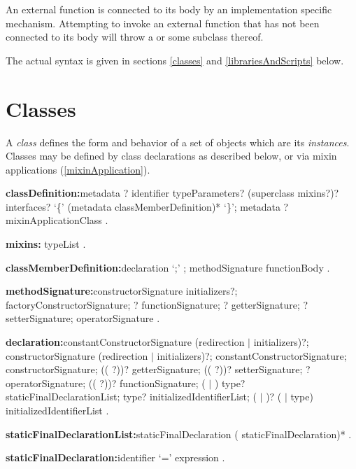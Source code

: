 \documentclass{article}
\begin{document}
\LMHash{}
An external function is connected to its body by an implementation specific mechanism.
Attempting to invoke an external function that has not been connected to its body will throw a  or some subclass thereof.

\LMHash{}
The actual syntax is given in sections \ref{classes} and \ref{librariesAndScripts} below.


\section{Classes}

\LMHash{}
A {\em class} defines the form and behavior of a set of objects which are its {\em instances}.
Classes may be defined by class declarations as described below, or via mixin applications (\ref{mixinApplication}).

\begin{grammar}
{\bf classDefinition:}metadata \ABSTRACT{}? \CLASS{} identifier typeParameters?
  \gnewline{} (superclass mixins?)? interfaces?
  \gnewline{} `\{' (metadata classMemberDefinition)* `\}';
  metadata \ABSTRACT{}? \CLASS{} mixinApplicationClass
  .

{\bf mixins:}\WITH{} typeList
  .

{\bf classMemberDefinition:}declaration `{\escapegrammar ;}' ;
  methodSignature functionBody
  .

{\bf methodSignature:}constructorSignature initializers?;
  factoryConstructorSignature;
  \STATIC{}? functionSignature;
  \STATIC{}? getterSignature;
  \STATIC{}? setterSignature;
  operatorSignature
  .

{\bf declaration:}constantConstructorSignature (redirection $|$ initializers)?;
  constructorSignature (redirection $|$ initializers)?;
  \EXTERNAL{} constantConstructorSignature;
  \EXTERNAL{} constructorSignature;
  ((\EXTERNAL{} \STATIC{}?))? getterSignature;
  ((\EXTERNAL{} \STATIC{}?))? setterSignature;
  \EXTERNAL{}? operatorSignature;
  ((\EXTERNAL{} \STATIC{}?))? functionSignature;
  \STATIC{} (\FINAL{} $|$ \CONST{}) type? staticFinalDeclarationList;
  \FINAL{} type? initializedIdentifierList;
  (\STATIC{} $|$ \COVARIANT{})? (\VAR{} $|$ type) initializedIdentifierList
  .

{\bf staticFinalDeclarationList:}staticFinalDeclaration (\gcomma{} staticFinalDeclaration)*
  .

{\bf staticFinalDeclaration:}identifier `=' expression
  .
\end{grammar}
\end{document}
